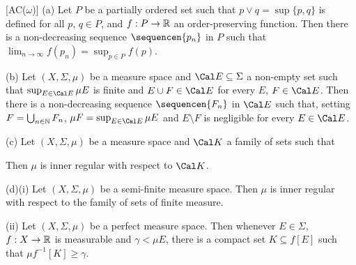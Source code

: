  [AC($\omega$)]
(a) Let $P$ be a partially ordered set such that
$p\vee q=\sup\{p,q\}$ is defined for all $p$, $q\in P$, and
$f:P\to\Bbb R$ an order-preserving function.    Then there is a
non-decreasing sequence $\sequencen{p_n}$ in $P$ such that
$\lim_{n\to\infty}f(p_n)=\sup_{p\in P}f(p)$.

(b) Let $(X,\Sigma,\mu)$ be a measure space and
$\Cal E\subseteq\Sigma$ a non-empty set such that
$\sup_{E\in\Cal E}\mu E$ is
finite and $E\cup F\in\Cal E$ for every $E$, $F\in\Cal E$.
Then there is a non-decreasing
sequence $\sequencen{F_n}$ in $\Cal E$ such that, setting
$F=\bigcup_{n\in\Bbb N}F_n$, $\mu F=\sup_{E\in\Cal E}\mu E$ and
$E\setminus F$ is negligible for every $E\in\Cal E$.

(c) Let $(X,\Sigma,\mu)$ be a measure space and
$\Cal K$ a family of sets such that


\noindent Then $\mu$ is inner regular with respect to $\Cal K$.

(d)(i) Let $(X,\Sigma,\mu)$ be a semi-finite measure space.
Then $\mu$ is inner regular with respect to the family of sets of finite
measure.

\quad(ii) Let $(X,\Sigma,\mu)$ be a perfect measure space.   Then whenever
$E\in\Sigma$, $f:X\to\Bbb R$ is measurable and $\gamma<\mu E$, there is a
compact set $K\subseteq f[E]$ such that $\mu f^{-1}[K]\ge\gamma$.

